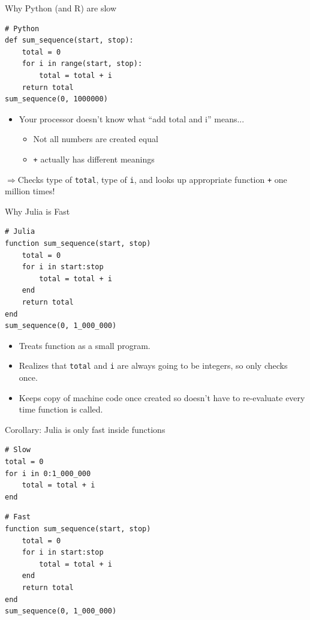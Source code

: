 \documentclass[11pt]{beamer}
\begin{document}
\begin{frame}[fragile, t]{Why Python (and R) are slow }
\begin{verbatim}
# Python
def sum_sequence(start, stop):
    total = 0
    for i in range(start, stop):
        total = total + i
    return total
sum_sequence(0, 1000000)
\end{verbatim}
\pause
\begin{itemize}
    \item Your processor doesn't know what ``add total and i'' means...
    \begin{itemize}
        \pause \item Not all numbers are created equal
        \pause \item \texttt{+} actually has different meanings
    \end{itemize}
\end{itemize}
\pause
$\Rightarrow$Checks type of \texttt{total}, type of \texttt{i}, and looks up appropriate function \texttt{+} one million times!
\end{frame}

\begin{frame}[fragile, t]{Why Julia is Fast}
\begin{verbatim}
# Julia
function sum_sequence(start, stop)
    total = 0
    for i in start:stop
        total = total + i
    end
    return total
end
sum_sequence(0, 1_000_000)
    \end{verbatim}
\begin{itemize}
    \pause \item  Treats function as a small program.
    \pause \item Realizes that \texttt{total} and \texttt{i} are always going to be integers, so only checks once.
    \pause \item Keeps copy of machine code once created so doesn't have to re-evaluate every time function is called.
\end{itemize}
\end{frame}

\begin{frame}[fragile]{Corollary: Julia is only fast inside functions}
\begin{verbatim}
# Slow
total = 0
for i in 0:1_000_000
    total = total + i
end
\end{verbatim}
\pause
\begin{verbatim}
# Fast
function sum_sequence(start, stop)
    total = 0
    for i in start:stop
        total = total + i
    end
    return total
end
sum_sequence(0, 1_000_000)
\end{verbatim}
\end{frame}
\end{document}
